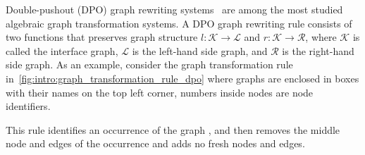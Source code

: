  Double-pushout (DPO) graph rewriting systems~\cite{corradini1997algebraic,habel2001double} are among the most studied algebraic graph transformation systems. A DPO graph rewriting rule consists of two functions that preserves graph structure $l:\mathcal{K} \to \mathcal{L}$ and $r:\mathcal{K} \to \mathcal{R}$, where $\mathcal{K}$ is called the interface graph, $\mathcal{L}$ is the left-hand side graph, and $\mathcal{R}$ is the right-hand side graph. As an example, consider the graph transformation rule in~\autoref{fig:intro:graph_transformation_rule_dpo} where graphs are enclosed in boxes with their names on the top left corner, numbers inside nodes are node identifiers.
  \begin{figure}[!htbp]
    \centering
    \caption{}
    \label{fig:intro:graph_transformation_rule_dpo}
\end{figure}
This rule identifies an occurrence of the graph , and then removes the middle node and edges of the occurrence and adds no fresh nodes and edges. 

